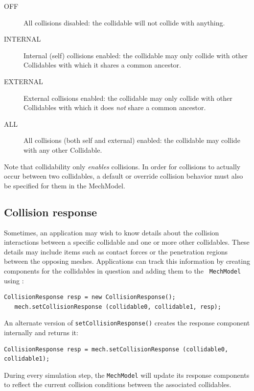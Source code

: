 \begin{description}

\item[OFF]\mbox{}

All collisions disabled: the collidable will not collide with
anything.

\item[INTERNAL]\mbox{}

Internal (self) collisions enabled: the collidable may only collide
with other Collidables with which it shares a common ancestor.

\item[EXTERNAL]\mbox{}

External collisions enabled: the collidable may only collide with
other Collidables with which it does {\it not} share a common
ancestor.

\item[ALL]\mbox{}

All collisions (both self and external) enabled: the collidable may
collide with any other Collidable.

\end{description}

Note that collidability only {\it enables} collisions.  In order for
collisions to actually occur between two collidables, a default or
override collision behavior must also be specified for them in the
MechModel.

\subsection{Collision response}

Sometimes, an application may wish to know details about the collision
interactions between a specific collidable and one or more other
collidables.  These details may include items such as contact
forces or the penetration regions between the opposing meshes.
Applications can track this information by
creating 
components for the collidables in question and adding them to the {\tt
MechModel} using 
:
%
\begin{lstlisting}[]
   CollisionResponse resp = new CollisionResponse();
   mech.setCollisionResponse (collidable0, collidable1, resp);
\end{lstlisting}
%
An alternate version of {\tt setCollisionResponse()} creates the
response component internally and returns it:
%
\begin{lstlisting}[]
   CollisionResponse resp = mech.setCollisionResponse (collidable0, collidable1);
\end{lstlisting}
%
During every simulation step, the {\tt MechModel} will update its
response components to reflect the current collision conditions
between the associated collidables.

